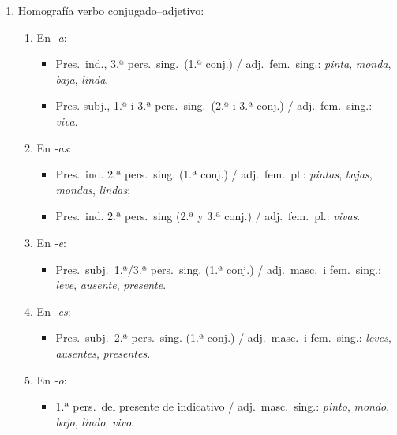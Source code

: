 {\begin{enumerate}
\begin{enumerate}
\item Otras terminaciones: \emph{sal} (verbo \emph{salir}) \emph{mentís}, \emph{pagaré}. 

\end{enumerate} \item Homografía verbo conjugado--adjetivo: \begin{enumerate} 

\item En \emph{-a}: \begin{itemize} \item Pres.\ ind., 3.ª pers.\  sing.\ (1.ª conj.) / adj.\ fem.\ sing.: {\em pinta}, \emph{monda}, \emph{ baja}, \emph{linda}. \item Pres. subj., 1.ª i 3.ª pers.\ sing.\ (2.ª i 3.ª conj.) / adj.\ fem.\ sing.: \emph{viva}. \end{itemize} 

\item En \emph{-as}: \begin{itemize} \item Pres.\ ind. 2.ª pers.\ sing. (1.ª conj.) / adj.\ fem.\ pl.: \emph{pintas}, \emph{bajas}, \emph{mondas}, \emph{lindas}; \item Pres.\ ind. 2.ª pers.\ sing (2.ª y 3.ª conj.) / adj.\ fem.\ pl.: \emph{vivas}. \end{itemize} 

\item En \emph{-e}: \begin{itemize} \item Pres.\ subj.\ 1.ª/3.ª pers.\ sing. (1.ª conj.) / adj.\ masc.\ i fem.\ sing.: \emph{leve}, \emph{ausente}, \emph{presente}. \end{itemize} 

\item En \emph{-es}: \begin{itemize} \item Pres.\ subj.\ 2.ª pers.\ sing. (1.ª conj.) / adj.\ masc.\ i fem.\ sing.: \emph{leves}, \emph{ausentes}, \emph{presentes}. \end{itemize} 

\item En \emph{-o}: \begin{itemize} \item 1.ª pers.\ del presente de indicativo / adj.\ masc.\ sing.: \emph{pinto}, \emph{mondo}, \emph{bajo}, \emph{lindo}, \emph{vivo}. \end{itemize} 

\end{enumerate} 


\end{enumerate}}
